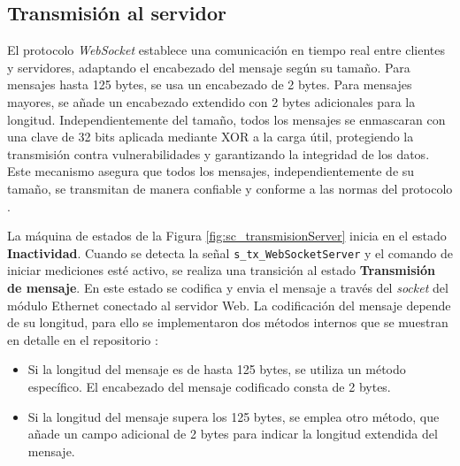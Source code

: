 \subsection{Transmisión al servidor}

El protocolo \textit{WebSocket} establece una comunicación en tiempo real entre clientes y servidores, adaptando el encabezado del mensaje según su tamaño. Para mensajes hasta 125 bytes, se usa un encabezado de 2 bytes. Para mensajes mayores, se añade un encabezado extendido con 2 bytes adicionales para la longitud. Independientemente del tamaño, todos los mensajes se enmascaran con una clave de 32 bits aplicada mediante XOR a la carga útil, protegiendo la transmisión contra vulnerabilidades y garantizando la integridad de los datos. Este mecanismo asegura que todos los mensajes, independientemente de su tamaño, se transmitan de manera confiable y conforme a las normas del protocolo \cite{websockeWiki}. 



La máquina de estados de la Figura \ref{fig:sc_transmisionServer} inicia en el estado \textbf{Inactividad}. Cuando se detecta la señal \texttt{s\_tx\_WebSocketServer} y el comando de iniciar mediciones esté activo, se realiza una transición al estado \textbf{Transmisión de mensaje}. En este estado se codifica y envia el mensaje a través del \textit{socket} del módulo Ethernet conectado al servidor Web. La codificación del mensaje depende de su longitud, para ello se implementaron dos métodos internos que se muestran en detalle en el repositorio \cite{FirmwareSCA2024}:
\begin{itemize}
  \item Si la longitud del mensaje es de hasta 125 bytes, se utiliza un método específico. El encabezado del mensaje codificado consta de 2 bytes.
  \item Si la longitud del mensaje supera los 125 bytes, se emplea otro método, que añade un campo adicional de 2 bytes para indicar la longitud extendida del mensaje.
\end{itemize}

